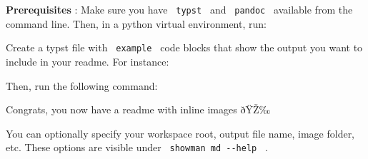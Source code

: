 \textbf{Prerequisites} : Make sure you have \texttt{\ typst\ } and
\texttt{\ pandoc\ } available from the command line. Then, in a python
virtual environment, run:

\begin{Shaded}
\begin{Highlighting}[]
\end{Highlighting}
\end{Shaded}

Create a typst file with
\texttt{\ \textasciigrave{}\textasciigrave{}\textasciigrave{}example\ }
code blocks that show the output you want to include in your readme. For
instance:

\begin{Shaded}
\begin{Highlighting}[]


\NormalTok{    \}}
\NormalTok{  \})}
\NormalTok{\})}
\end{Highlighting}
\end{Shaded}


Then, run the following command:

\begin{Shaded}
\begin{Highlighting}[]
\end{Highlighting}
\end{Shaded}

Congrats, you now have a readme with inline images ðŸŽ‰

You can optionally specify your workspace root, output file name, image
folder, etc. These options are visible under
\texttt{\ showman\ md\ -\/-help\ } .

